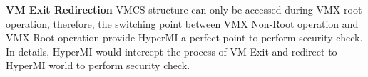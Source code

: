 \documentclass[conference]{IEEEtran}
\begin{document}
\textbf{VM Exit Redirection}
VMCS structure can only be accessed during VMX root operation, therefore, the switching point between VMX Non-Root operation and VMX Root operation provide HyperMI a perfect point to perform security check. In details, HyperMI would intercept the process of VM Exit and redirect to HyperMI world to perform security check. 
%
%
\end{document}
